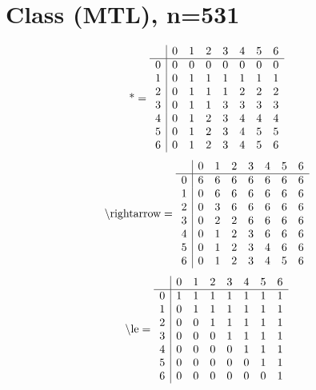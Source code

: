 \documentclass[11pt]{article}
\begin{document}
\section{Class (MTL), n=531}
\[\text{*} = 
\begin{array}{r | r r r r r r r}
 & 0 & 1 & 2 & 3 & 4 & 5 & 6 \\ \hline
0 & 0 & 0 & 0 & 0 & 0 & 0 & 0 \\
1 & 0 & 1 & 1 & 1 & 1 & 1 & 1 \\
2 & 0 & 1 & 1 & 1 & 2 & 2 & 2 \\
3 & 0 & 1 & 1 & 3 & 3 & 3 & 3 \\
4 & 0 & 1 & 2 & 3 & 4 & 4 & 4 \\
5 & 0 & 1 & 2 & 3 & 4 & 5 & 5 \\
6 & 0 & 1 & 2 & 3 & 4 & 5 & 6 \\
\end{array}
\]
\[\text{\textbackslash rightarrow} = 
\begin{array}{r | r r r r r r r}
 & 0 & 1 & 2 & 3 & 4 & 5 & 6 \\ \hline
0 & 6 & 6 & 6 & 6 & 6 & 6 & 6 \\
1 & 0 & 6 & 6 & 6 & 6 & 6 & 6 \\
2 & 0 & 3 & 6 & 6 & 6 & 6 & 6 \\
3 & 0 & 2 & 2 & 6 & 6 & 6 & 6 \\
4 & 0 & 1 & 2 & 3 & 6 & 6 & 6 \\
5 & 0 & 1 & 2 & 3 & 4 & 6 & 6 \\
6 & 0 & 1 & 2 & 3 & 4 & 5 & 6 \\
\end{array}
\]
\[\text{\textbackslash le} = 
\begin{array}{r | r r r r r r r}
 & 0 & 1 & 2 & 3 & 4 & 5 & 6 \\ \hline
0 & 1 & 1 & 1 & 1 & 1 & 1 & 1 \\
1 & 0 & 1 & 1 & 1 & 1 & 1 & 1 \\
2 & 0 & 0 & 1 & 1 & 1 & 1 & 1 \\
3 & 0 & 0 & 0 & 1 & 1 & 1 & 1 \\
4 & 0 & 0 & 0 & 0 & 1 & 1 & 1 \\
5 & 0 & 0 & 0 & 0 & 0 & 1 & 1 \\
6 & 0 & 0 & 0 & 0 & 0 & 0 & 1 \\
\end{array}
\]
\end{document}
